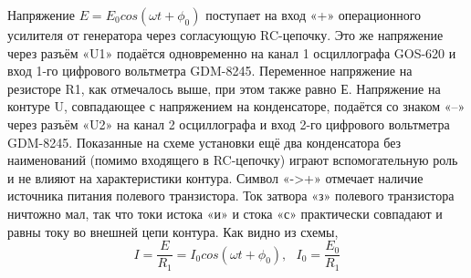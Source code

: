 \documentclass[a4paper]{article}
\begin{document}
Напряжение $ E = E_0cos(\omega t + \phi_0) $ поступает на вход «+» операционного усилителя от генератора через согласующую RC-цепочку. Это же напряжение через разъём «U1» подаётся одновременно на канал 1 осциллографа GOS-620 и вход 1-го цифрового вольтметра GDM-8245. Переменное напряжение на резисторе R1, как отмечалось выше, при этом также равно Е. Напряжение на контуре U, совпадающее с напряжением на конденсаторе, подаётся со знаком «–» через разъём «U2» на канал 2 осциллографа и вход 2-го цифрового вольтметра GDM-8245. Показанные на схеме установки ещё два конденсатора без наименований (помимо входящего в RC-цепочку) играют вспомогательную роль и не влияют на характеристики контура. Символ «->+» отмечает наличие источника питания полевого транзистора. Ток затвора «з» полевого транзистора ничтожно мал, так что токи истока «и» и стока «с» практически совпадают и равны току во внешней цепи контура. Как видно из схемы, \[ I = \frac{E}{R_1} = I_0cos(\omega t + \phi_0), \:\:\: I_0 = \frac{E_0}{R_1} \]
\end{document}
